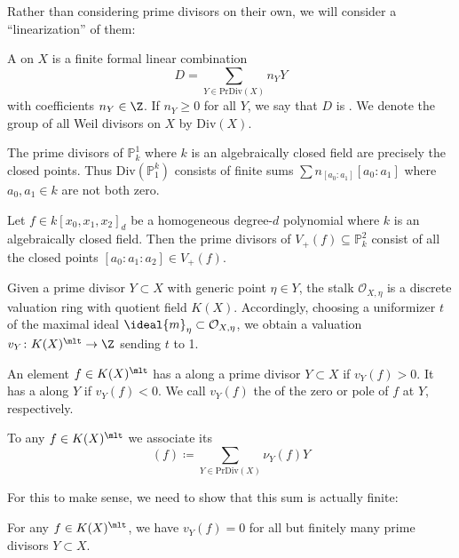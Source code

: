\documentclass[wip, algebra]{bsteffan-lecturenotes}
\newcommand{\cO}{\mathcal{O}}
\renewcommand{\P}{\mathbb{P}}
\newcommand{\Div}{\mathrm{Div}}
\newcommand{\PrDiv}{\mathrm{PrDiv}}
\begin{document}
Rather than considering prime divisors on their own, we will consider a \enquote{linearization} of them:
\begin{definition}
	A  on $X$ is a finite formal linear combination 
	\begin{equation*}
		D = \sum_{Y \in \PrDiv(X)} n_Y Y
	\end{equation*}
	with coefficients $n_Y \in \Z$.
	If $n_Y \geq 0$ for all $Y$, we say that $D$ is .
	We denote the group of all Weil divisors on $X$ by $\Div(X)$.
\end{definition}
\begin{example}
	The prime divisors of $\P^1_k$ where $k$ is an algebraically closed field are precisely the closed points. 
	Thus $\Div(\P^k_1)$ consists of finite sums $\sum n_{[a_0 : a_1]} [a_0 : a_1]$ where $a_0, a_1 \in k$ are not both zero.
\end{example}
\begin{example}
	Let $f \in k[x_0, x_1, x_2]_d$ be a homogeneous degree-$d$ polynomial where $k$ is an algebraically closed field.
	Then the prime divisors of $V_+(f) \subseteq \P^2_k$ consist of all the closed points $[a_0 : a_1 : a_2] \in V_+(f)$.
\end{example}
Given a prime divisor $Y \subset X$ with generic point $\eta \in Y$, the stalk $\cO_{X, \eta}$ is a discrete valuation ring with quotient field $K(X)$.
Accordingly, choosing a uniformizer $t$ of the maximal ideal $\ideal{m}_\eta \subset \cO_{X, \eta}$, we obtain a valuation $v_Y\colon K(X)^\mlt \to \Z$ sending $t$ to 1.
\begin{definition}
	An element $f \in K(X)^\mlt$ has a  along a prime divisor $Y \subset X$ if $v_Y(f) > 0$.
	It has a  along $Y$ if $v_Y(f) < 0$.
	We call $v_Y(f)$ the  of the zero or pole of $f$ at $Y$, respectively.
\end{definition}
\begin{definition}
	To any $f \in K(X)^\mlt$ we associate its 
	\begin{equation*}
		(f) \coloneq \sum_{Y \in \PrDiv(X)} \nu_Y(f) Y
	\end{equation*}
\end{definition}
For this to make sense, we need to show that this sum is actually finite:
\begin{lemma}
	For any $f \in K(X)^\mlt$, we have $v_Y(f) = 0$ for all but finitely many prime divisors $Y \subset X$.
\end{lemma}
\end{document}
